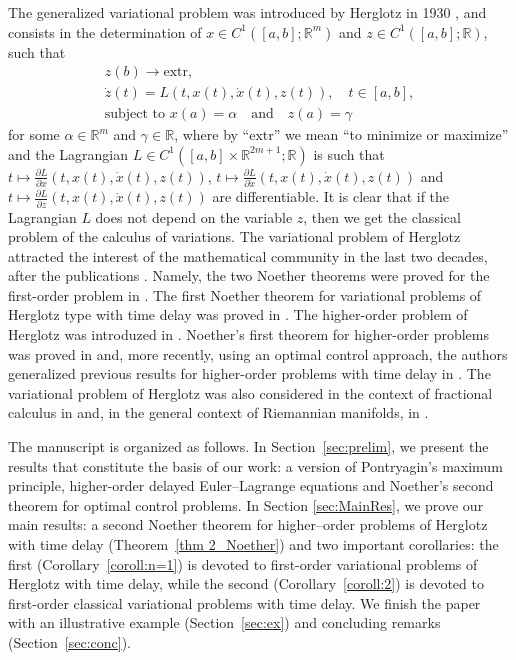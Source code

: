 \documentclass{my-aims}
\theoremstyle{definition}
\begin{document}
The generalized variational problem was introduced 
by Herglotz in 1930 \cite{Herglotz1930},
and consists in the determination of
$x\in C^1([a,b];\mathbb{R}^m)$
and $z\in C^1([a,b];\mathbb{R})$,
such that
\begin{equation}
\label{PH}
\tag{$H^1$}
\begin{gathered}
z(b)\longrightarrow \mathrm{extr},\\
\dot{z}(t)=L(t,x(t),\dot{x}(t),z(t)), \quad t \in [a,b],\\
\text{subject to } x(a)=\alpha \quad \text{and} \quad z(a)=\gamma
\end{gathered}
\end{equation}
for some $\alpha \in \mathbb{R}^m$ and $\gamma \in \mathbb{R}$,
where by ``$\mathrm{extr}$'' we mean ``to minimize or maximize'' and
the Lagrangian $L \in C^1([a,b]\times\mathbb{R}^{2m+1}; \mathbb{R})$ 
is such that $\displaystyle t \mapsto \frac{\partial L}{\partial x}
\left(t,x(t), \dot{x}(t), z(t)\right)$, $\displaystyle t
\mapsto \frac{\partial L}{\partial \dot{x}}\left(t,
x(t), \dot{x}(t), z(t)\right)$  and $\displaystyle t \mapsto
\frac{\partial L}{\partial z}\left(t, x(t), \dot{x}(t), z(t)\right)$
are differentiable. It is clear that if the Lagrangian 
$L$ does not depend on the variable $z$,
then we get the classical problem of the calculus of variations.
The variational problem of Herglotz attracted the interest of the mathematical
community in the last two decades, after the publications 
\cite{Guenther1996SIAM,Guenther1996}. Namely, the two Noether theorems were proved 
for the first-order problem in \cite{Georgieva2002,Georgieva2005,Georgieva2003}. 
The first Noether theorem for variational problems of Herglotz type with time delay 
was proved in \cite{MyArt02}. The higher-order problem of Herglotz was introduzed in \cite{MyArt01}.
Noether's first theorem for higher-order problems was proved in \cite{MyArt04} and, 
more recently, using an optimal control approach, the authors generalized previous 
results for higher-order problems with time delay in \cite{MyArt05}.
The variational problem of Herglotz was also considered in the context 
of fractional calculus in \cite{Almeida+Malinowska2014} and, in the general 
context of Riemannian manifolds, in \cite{Ligia+Luis+Natalia2016}.

The manuscript is organized as follows. In Section~\ref{sec:prelim}, we present 
the results that constitute the basis of our work: a version of 
Pontryagin's maximum principle, higher-order delayed Euler--Lagrange equations
and Noether's second theorem for optimal control problems. In Section \ref{sec:MainRes}, 
we prove our main results: a second Noether theorem for higher--order problems 
of Herglotz with time delay (Theorem~\ref{thm 2_Noether}) 
and two important corollaries: the first (Corollary~\ref{coroll:n=1}) 
is devoted to first-order variational  problems of Herglotz 
with time delay, while the second (Corollary~\ref{coroll:2}) 
is devoted to first-order classical variational problems with time delay.
We finish the paper with an illustrative example (Section~\ref{sec:ex})
and concluding remarks (Section~\ref{sec:conc}).
\end{document}
